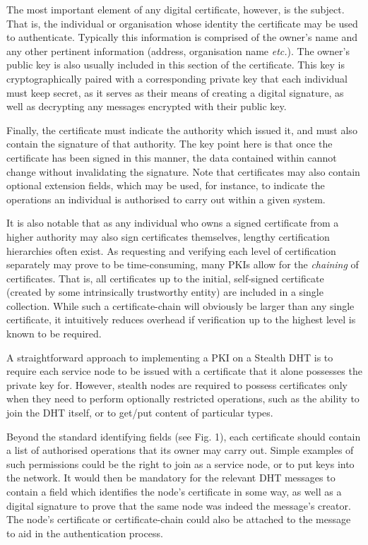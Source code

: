 \documentclass[times, 10pt,twocolumn]{article}
\begin{document}
The most important element of any digital certificate, however, is the
subject. That is, the individual or organisation whose identity the
certificate may be used to authenticate. Typically this information is
comprised of the owner's name and any other pertinent information
(address, organisation name \emph{etc.}). The owner's public key is
also usually included in this section of the certificate. This key is
cryptographically paired with a corresponding private key that each
individual must keep secret, as it serves as their means of creating a
digital signature, as well as decrypting any messages encrypted with
their public key.

Finally, the certificate must indicate the authority which issued it,
and must also contain the signature of that authority. The key point
here is that once the certificate has been signed in this manner, the
data contained within cannot change without invalidating the signature.
Note that certificates may also contain optional extension fields,
which may be used, for instance, to indicate the operations an
individual is authorised to carry out within a given system.

It is also notable that as any individual who owns a signed certificate
from a higher authority may also sign certificates themselves, lengthy
certification hierarchies often exist. As requesting and verifying each
level of certification separately may prove to be time-consuming, many
PKIs allow for the \emph{chaining} of certificates. That is, all
certificates up to the initial, self-signed certificate (created by
some intrinsically trustworthy entity) are included in a single
collection. While such a certificate-chain will obviously be larger
than any single certificate, it intuitively reduces overhead if
verification up to the highest level is known to be required.

\label{sect-auth}

A straightforward approach to implementing a PKI on a Stealth DHT is to
require each service node to be issued with a certificate that it alone
possesses the private key for. However, stealth nodes are required to
possess certificates only when they need to perform optionally
restricted operations, such as the ability to join the DHT itself, or
to get/put content of particular types.

Beyond the standard identifying fields (see Fig. 1), each certificate
should contain a list of authorised operations that its owner may carry
out. Simple examples of such permissions could be the right to join as
a service node, or to put keys into the network. It would then be
mandatory for the relevant DHT messages to contain a field which
identifies the node's certificate in some way, as well as a digital
signature to prove that the same node was indeed the message's creator.
The node's certificate or certificate-chain could also be attached to
the message to aid in the authentication process.
\end{document}
